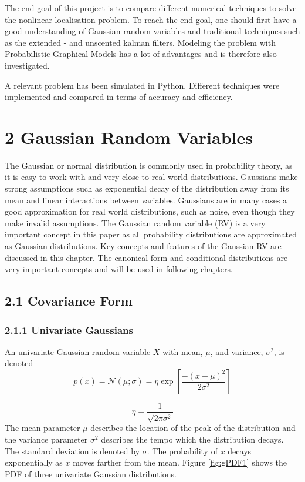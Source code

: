 \documentclass[12pt,oneside,openany,a4paper, %
afrikaans,english,
]{memoir}
\numberwithin{equation}{chapter}
\begin{document}
The end goal of this project is to compare different numerical techniques to solve the nonlinear localisation problem. To reach the end goal, one should first have a good understanding of Gaussian random variables and traditional techniques such as the extended - and unscented kalman filters. Modeling the problem with Probabilistic Graphical Models has a lot of advantages and is therefore also investigated. 

A relevant problem has been simulated in Python. Different techniques were implemented and compared in terms of accuracy and efficiency.

\chapter{2 Gaussian Random Variables}
\setcounter{chapter}{2}
The Gaussian or normal distribution is commonly used in probability theory, as it is easy to work with and very close to real-world distributions. Gaussians make strong assumptions such as exponential decay of the distribution away from its mean and linear interactions between variables. Gaussians are in many cases a good approximation for real world distributions, such as noise, even though they make invalid assumptions. The Gaussian random variable (RV) is a very important concept in this paper as all probability distributions are approximated as Gaussian distributions. Key concepts and features of the Gaussian RV are discussed in this chapter. The canonical form and conditional distributions are very important concepts and will be used in following chapters.

\section{2.1 Covariance Form}
\subsection{2.1.1 Univariate Gaussians}
An univariate Gaussian random variable $X$ with mean, $\mu$, and variance, $\sigma^2$, is denoted
\begin{equation}\label{eq:1}
p(x) = \mathcal{N}(\mu;\sigma) = \eta\exp\left[\frac{-(x-\mu)^2}{2\sigma^2}\right]
\end{equation}

\begin{equation}\label{eq:2}
\eta = \frac{1}{\sqrt{2\pi\sigma^2}}
\end{equation}
The mean parameter $\mu$ describes the location of the peak of the distribution and the variance parameter $\sigma^2$ describes the tempo which the distribution decays. The standard deviation is denoted by $\sigma$. The probability of $x$ decays exponentially as $x$ moves farther from the mean. Figure \ref{fig:gPDF1} shows the PDF of three univariate Gaussian distributions. 
\end{document}
